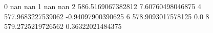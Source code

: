 0 nan nan
1 nan nan
2 586.5169067382812 7.60760498046875
4 577.9683227539062 -0.94097900390625
6 578.9093017578125 0.0
8 579.2725219726562 0.36322021484375
